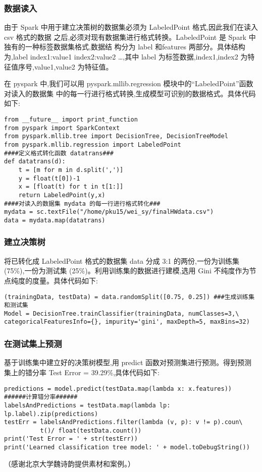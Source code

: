 \subsubsection{数据读入}\label{ux6570ux636eux8bfbux5165}

由于 Spark 中用于建立决策树的数据集必须为 LabeledPoint
格式,因此我们在读入 csv 格式的数据
之后,必须对现有数据集进行格式转换。LabeledPoint 是 Spark
中独有的一种标签数据集格式,数据结 构分为 label 和features
两部分。具体结构为,label index1:value1 index2:value2 \ldots{},其中 label
为标签数据,index1,index2 为特征值序号,value1,value2 为特征值。

在 pyspark 中,我们可以用 pyspark.mllib.regression
模块中的``LabeledPoint''函数对读入的数据集
中的每一行进行格式转换,生成模型可识别的数据格式。具体代码如下:

\begin{lstlisting}
from __future__ import print_function
from pyspark import SparkContext
from pyspark.mllib.tree import DecisionTree, DecisionTreeModel
from pyspark.mllib.regression import LabeledPoint
####定义格式转化函数 datatrans###
def datatrans(d):
    t = [m for m in d.split(',')]
    y = float(t[0])-1
    x = [float(t) for t in t[1:]]
    return LabeledPoint(y,x)
####对读入的数据集 mydata 的每一行进行格式转化###
mydata = sc.textFile("/home/pku15/wei_sy/finalHWdata.csv")
data = mydata.map(datatrans)
\end{lstlisting}

\subsubsection{建立决策树}\label{ux5efaux7acbux51b3ux7b56ux6811}

将已转化成 LabeledPoint 格式的数据集 data 分成 3:1
的两份,一份为训练集(75\%),一份为测试集
(25\%)。利用训练集的数据进行建模,选用 Gini
不纯度作为节点纯度的度量。具体代码如下:

\begin{lstlisting}
(trainingData, testData) = data.randomSplit([0.75, 0.25]) ###生成训练集和测试集
Model = DecisionTree.trainClassifier(trainingData, numClasses=3,\
categoricalFeaturesInfo={}, impurity='gini', maxDepth=5, maxBins=32)
\end{lstlisting}

\subsubsection{在测试集上预测}\label{ux5728ux6d4bux8bd5ux96c6ux4e0aux9884ux6d4b}

基于训练集中建立好的决策树模型,用 predict
函数对预测集进行预测。得到预测集上的错分率 Test Error =
39.29\%,具体代码如下:

\begin{lstlisting}
predictions = model.predict(testData.map(lambda x: x.features))
######计算错分率######
labelsAndPredictions = testData.map(lambda lp: lp.label).zip(predictions)
testErr = labelsAndPredictions.filter(lambda (v, p): v != p).coun\
          t()/ float(testData.count())
print('Test Error = ' + str(testErr))
print('Learned classification tree model: ' + model.toDebugString())
\end{lstlisting}

（感谢北京大学魏诗韵提供素材和案例。）
